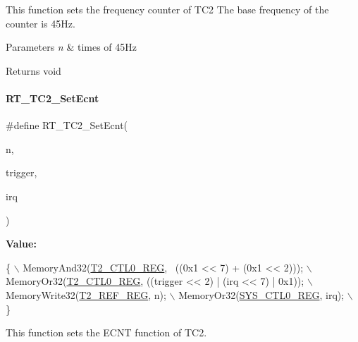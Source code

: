This function sets the frequency counter of T\+C2 The base frequency of the counter is 45\+Hz. 


\begin{DoxyParams}{Parameters}
{\em n} & times of 45\+Hz \\
\hline
\end{DoxyParams}
\begin{DoxyReturn}{Returns}
void 
\end{DoxyReturn}
\mbox{\label{a00047_af07bf5769df0423324194f22e008e832}} 
\paragraph{\texorpdfstring{R\+T\+\_\+\+T\+C2\+\_\+\+Set\+Ecnt}{RT\_TC2\_SetEcnt}}
{\footnotesize\ttfamily \#define R\+T\+\_\+\+T\+C2\+\_\+\+Set\+Ecnt(\begin{DoxyParamCaption}\item[{}]{n,  }\item[{}]{trigger,  }\item[{}]{irq }\end{DoxyParamCaption})}

{\bfseries Value\+:}
\begin{DoxyCode}
\{                                                                 \(\backslash\)
        MemoryAnd32(\mbox{\hyperlink{a00020_adadaa0ab1ebbd7ba9b70dfd24c3ed44daf2e9deb36631241181cbf09e8d959475}{T2\_CTL0\_REG}}, ~((0x1 << 7) + (0x1 << 2)));         \(\backslash\)
        MemoryOr32(\mbox{\hyperlink{a00020_adadaa0ab1ebbd7ba9b70dfd24c3ed44daf2e9deb36631241181cbf09e8d959475}{T2\_CTL0\_REG}}, ((trigger << 2) | (irq << 7) | 0x1)); \(\backslash\)
        MemoryWrite32(\mbox{\hyperlink{a00020_adadaa0ab1ebbd7ba9b70dfd24c3ed44da840de759e5083c864ed1c57dad568251}{T2\_REF\_REG}}, n);                                 \(\backslash\)
        MemoryOr32(\mbox{\hyperlink{a00020_adadaa0ab1ebbd7ba9b70dfd24c3ed44dab61d9968d782d6c00e9de838e38913f5}{SYS\_CTL0\_REG}}, irq);                                \(\backslash\)
    \}
\end{DoxyCode}


This function sets the E\+C\+NT function of T\+C2. 


